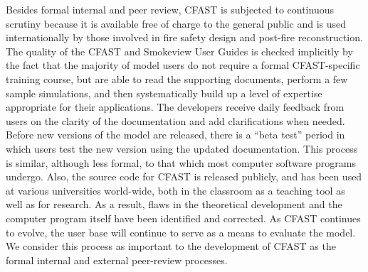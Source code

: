 \documentclass[12pt]{book}
\begin{document}
Besides formal internal and peer review, CFAST is subjected to continuous scrutiny because it is available free of charge to the general public and is used internationally by those involved in fire safety design and post-fire reconstruction. The quality of the CFAST and Smokeview User Guides is checked implicitly by the fact that the majority of model users do not require a formal CFAST-specific training course, but are able to read the supporting documents, perform a few sample simulations, and then systematically build up a level of expertise appropriate for their applications. The developers receive daily feedback from users on the clarity of the documentation and add clarifications when needed. Before new versions of the model are released, there is a  ``beta test'' period in which users test the new version using the updated documentation. This process is similar, although less formal, to that which most computer software programs undergo. Also, the source code for CFAST is released publicly, and has been used at various universities world-wide, both in the classroom as a teaching tool as well as for research. As a result, flaws in the theoretical development and the computer program itself have been identified and corrected. As CFAST continues to evolve, the user base will continue to serve as a means to evaluate the model. We consider this process as important to the development of CFAST as the formal internal and external peer-review processes.

\backmatter

\printbibliography[heading=bibintoc,title={References}]

\label{last_page}
\end{document}
